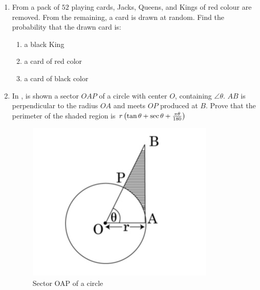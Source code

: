 \documentclass{article}
\begin{document}
\begin{enumerate}
\item From a pack of $52$ playing cards, Jacks, Queens, and Kings of red colour are removed. From the remaining, a card is drawn at random. Find the probability that the drawn card is:
    \begin{enumerate}
        \item a black King
        \item a card of red color
        \item a card of black color
    \end{enumerate}                                                                                                                                                                                           

\item In , is shown a sector $OAP$ of a circle with center $O$, containing $\angle \theta$. $AB$ is perpendicular to the radius $OA$ and meets $OP$ produced at $B$. Prove that the perimeter of the shaded region is $r\left(\tan\theta + \sec\theta +\frac{\pi\theta}{180}\right)$
    \begin{figure}[H]
        \includegraphics[width=\columnwidth]{./figs/sectorofcircle.jpg}                                     
        \caption{Sector OAP of a circle}      
        \label{fig:sectorofcircle}
    \end{figure}                                                                                             


\end{enumerate}
\end{document}

